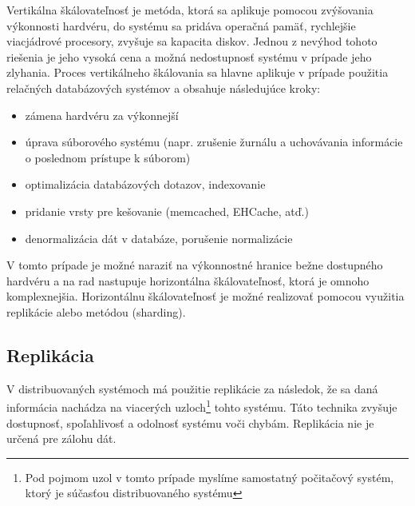 \documentclass[11pt,twoside,a4paper]{book}
\begin{document}
Vertikálna škálovateľnosť je metóda, ktorá sa aplikuje pomocou zvýšovania výkonnosti hardvéru, do systému sa pridáva operačná pamäť, rychlejšie viacjádrové procesory, zvyšuje sa kapacita diskov. Jednou z nevýhod tohoto riešenia je jeho vysoká cena a možná nedostupnosť systému v prípade jeho zlyhania.
Proces vertikálneho škálovania sa hlavne aplikuje v prípade použitia relačných databázových systémov  a obsahuje následujúce kroky:
\begin{itemize}
 \item zámena hardvéru za výkonnejší
 \item úprava súborového systému (napr. zrušenie žurnálu a uchovávania informácie o poslednom prístupe k súborom)
 \item optimalizácia databázových dotazov, indexovanie
 \item pridanie vrsty pre kešovanie (memcached, EHCache, atď.)
 \item denormalizácia dát v databáze, porušenie normalizácie
\end{itemize}

V tomto prípade je možné naraziť na výkonnostné hranice bežne dostupného hardvéru a na rad nastupuje horizontálna škálovateľnosť, ktorá je omnoho komplexnejšia. Horizontálnu škálovateľnosť je možné realizovať pomocou využitia replikácie alebo metódou  (sharding).

\subsection{Replikácia}

V distribuovaných systémoch má použitie replikácie za následok, že sa daná informácia nachádza na viacerých uzloch\footnote{Pod pojmom uzol v tomto prípade myslíme samostatný počitačový systém, ktorý je súčasťou distribuovaného systému} tohto systému. Táto technika zvyšuje dostupnosť, spoľahlivosť a odolnosť systému voči chybám. Replikácia nie je určená pre zálohu dát. 
\end{document}
